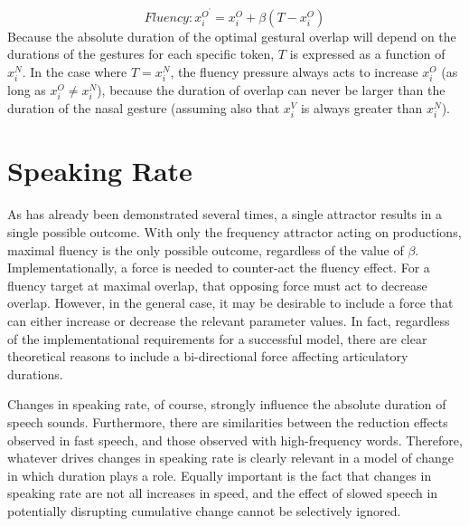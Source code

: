 \begin{equation}
Fluency:x_{i}^{O^{\prime}}=x_{i}^{O}+\beta(T-x_{i}^{O})\label{eq:Frequency attractor}
\end{equation}
Because the absolute duration of the optimal gestural overlap will
depend on the durations of the gestures for each specific token, $T$
is expressed as a function of $x_{i}^{N}$. In the case where $T=x_{i}^{N}$,
the fluency pressure always acts to increase $x_{i}^{O}$ (as long
as $x_{i}^{O}\neq x_{i}^{N}$), because the duration of overlap can
never be larger than the duration of the nasal gesture (assuming also
that $x_{i}^{V}$ is always greater than $x_{i}^{N}$). 

\section{Speaking Rate}

As has already been demonstrated several times, a single attractor
results in a single possible outcome. With only the frequency attractor
acting on productions, maximal fluency is the only possible outcome,
regardless of the value of $\beta$. Implementationally, a force is
needed to counter-act the fluency effect. For a fluency target at
maximal overlap, that opposing force must act to decrease overlap.
However, in the general case, it may be desirable to include a force
that can either increase or decrease the relevant parameter values.
In fact, regardless of the implementational requirements for a successful
model, there are clear theoretical reasons to include a bi-directional
force affecting articulatory durations. 

Changes in speaking rate, of course, strongly influence the absolute
duration of speech sounds. Furthermore, there are similarities between
the reduction effects observed in fast speech, and those observed
with high-frequency words. Therefore, whatever drives changes in speaking
rate is clearly relevant in a model of change in which duration plays
a role. Equally important is the fact that changes in speaking rate
are not all increases in speed, and the effect of slowed speech in
potentially disrupting cumulative change cannot be selectively ignored. 

